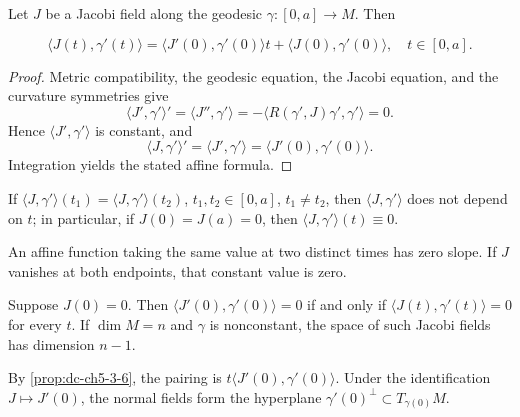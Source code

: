 \begin{proposition}
  \label{prop:dc-ch5-3-6}
  \leanok
  Let $J$ be a Jacobi field along the geodesic $\gamma:[0,a]\to M$. Then

  $$
  \langle J(t),\gamma'(t)\rangle=\langle J'(0),\gamma'(0)\rangle t+\langle J(0),\gamma'(0)\rangle,\quad t\in[0,a].
  $$

\end{proposition}
\begin{proof}
  \leanok
  \sketch
  Metric compatibility, the geodesic equation, the Jacobi equation, and the
  curvature symmetries give
  $$
  \langle J',\gamma'\rangle'=\langle J'',\gamma'\rangle=-\langle R(\gamma',J)\gamma',\gamma'\rangle=0.
  $$
  Hence $\langle J',\gamma'\rangle$ is constant, and
  $$
  \langle J,\gamma'\rangle'=\langle J',\gamma'\rangle=\langle J'(0),\gamma'(0)\rangle.
  $$
  Integration yields the stated affine formula.
\end{proof}

\begin{corollary}
  \label{cor:dc-ch5-3-7}
  \leanok
  If $\langle J,\gamma'\rangle(t_1)=\langle J,\gamma'\rangle(t_2)$, $t_1,t_2\in[0,a]$,
  $t_1\neq t_2$, then $\langle J,\gamma'\rangle$ does not depend on $t$; in
  particular, if $J(0)=J(a)=0$, then $\langle J,\gamma'\rangle(t)\equiv 0$.

  \sketch
  An affine function taking the same value at two distinct times has zero
  slope. If $J$ vanishes at both endpoints, that constant value is zero.
\end{corollary}

\begin{corollary}
  \label{cor:dc-ch5-3-8}
  \leanok
  Suppose $J(0)=0$. Then
  $\langle J'(0),\gamma'(0)\rangle=0$ if and only if
  $\langle J(t),\gamma'(t)\rangle=0$ for every $t$. If $\dim M=n$ and $\gamma$
  is nonconstant, the space of such Jacobi fields has dimension $n-1$.

  \sketch
  By \cref{prop:dc-ch5-3-6}, the pairing is
  $t\langle J'(0),\gamma'(0)\rangle$. Under the identification
  $J\mapsto J'(0)$, the normal fields form the hyperplane
  $\gamma'(0)^\perp\subset T_{\gamma(0)}M$.
\end{corollary}

